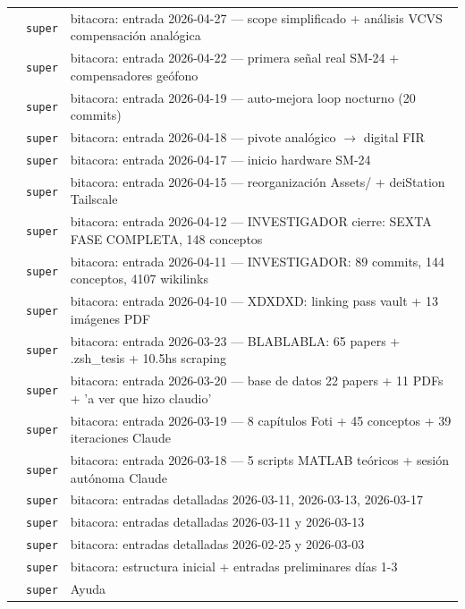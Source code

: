 \begin{longtable}{@{}p{1.7cm} p{1.5cm} p{12.2cm}@{}}
 & \texttt{\scriptsize super} & bitacora: entrada 2026-04-27 --- scope simplificado + análisis VCVS compensación analógica \\
 & \texttt{\scriptsize super} & bitacora: entrada 2026-04-22 --- primera señal real SM-24 + compensadores geófono \\
 & \texttt{\scriptsize super} & bitacora: entrada 2026-04-19 --- auto-mejora loop nocturno (20 commits) \\
 & \texttt{\scriptsize super} & bitacora: entrada 2026-04-18 --- pivote analógico $\rightarrow$ digital FIR \\
 & \texttt{\scriptsize super} & bitacora: entrada 2026-04-17 --- inicio hardware SM-24 \\
 & \texttt{\scriptsize super} & bitacora: entrada 2026-04-15 --- reorganización Assets/ + deiStation Tailscale \\
 & \texttt{\scriptsize super} & bitacora: entrada 2026-04-12 --- INVESTIGADOR cierre: SEXTA FASE COMPLETA, 148 conceptos \\
 & \texttt{\scriptsize super} & bitacora: entrada 2026-04-11 --- INVESTIGADOR: 89 commits, 144 conceptos, 4107 wikilinks \\
 & \texttt{\scriptsize super} & bitacora: entrada 2026-04-10 --- XDXDXD: linking pass vault + 13 imágenes PDF \\
 & \texttt{\scriptsize super} & bitacora: entrada 2026-03-23 --- BLABLABLA: 65 papers + .zsh\_tesis + 10.5hs scraping \\
 & \texttt{\scriptsize super} & bitacora: entrada 2026-03-20 --- base de datos 22 papers + 11 PDFs + 'a ver que hizo claudio' \\
 & \texttt{\scriptsize super} & bitacora: entrada 2026-03-19 --- 8 capítulos Foti + 45 conceptos + 39 iteraciones Claude \\
 & \texttt{\scriptsize super} & bitacora: entrada 2026-03-18 --- 5 scripts MATLAB teóricos + sesión autónoma Claude \\
 & \texttt{\scriptsize super} & bitacora: entradas detalladas 2026-03-11, 2026-03-13, 2026-03-17 \\
 & \texttt{\scriptsize super} & bitacora: entradas detalladas 2026-03-11 y 2026-03-13 \\
 & \texttt{\scriptsize super} & bitacora: entradas detalladas 2026-02-25 y 2026-03-03 \\
 & \texttt{\scriptsize super} & bitacora: estructura inicial + entradas preliminares días 1-3 \\
 & \texttt{\scriptsize super} & Ayuda \\

\end{longtable}
